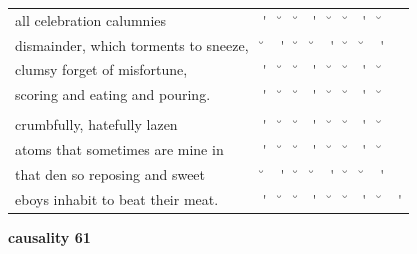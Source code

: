 \documentclass[12pt, landscape]{article}
\begin{document}
\begin{center}
\begin{tabularx}{\textwidth}{
>{\lefting\arraybackslash}X
c
c
c
c
c
c
c
c
c
}

all celebration calumnies & \'{} & \u{} & \u{} & \'{} & \u{} & \u{} & \'{} & \u{} & \\
dismainder, which torments to sneeze, & \u{} & \'{} & \u{} & \u{} & \'{} & \u{} & \u{} & \'{} & \\
clumsy forget of misfortune, & \'{} & \u{} & \u{} & \'{} & \u{} & \u{} & \'{} & \u{} & \\
scoring and eating and pouring. & \'{} & \u{} & \u{} & \'{} & \u{} & \u{} & \'{} & \u{} & \\
 & & & & & & & & \\
crumbfully, hatefully lazen & \'{} & \u{} & \u{} & \'{} & \u{} & \u{} & \'{} & \u{} & \\
atoms that sometimes are mine in & \'{} & \u{} & \u{} & \'{} & \u{} & \u{} & \'{} & \u{} & \\
that den so reposing and sweet & \u{} & \'{} & \u{} & \u{} & \'{} & \u{} & \u{} & \'{} & \\
eboys inhabit to beat their meat. & \'{} & \u{} & \u{} & \'{} & \u{} & \u{} & \'{} & \u{} & \'{} \\

\end{tabularx}
\end{center}

\vspace*{\fill}

\newpage

\vspace*{\fill}

\noindent \textbf{causality 61}
\noindent \hfill \par
\end{document}
